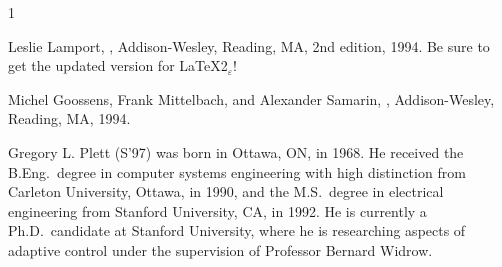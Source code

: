 \documentclass[%
	final,
	notitlepage,
	narroweqnarray,
	inline,
	twoside,
	]{ieee}
\newcommand{\latexiie}{\LaTeX2{\Large$_\varepsilon$}}
\begin{document}
%
%
%
%
%

\begin{thebibliography}{1}

Leslie Lamport,
,
\newblock Addison-Wesley, Reading, MA, 2nd edition, 1994.
\newblock Be sure to get the updated version for \latexiie!

Michel Goossens, Frank Mittelbach, and Alexander Samarin,
,
\newblock Addison-Wesley, Reading, MA, 1994.

\end{thebibliography}


\begin{biography}{Gregory L. Plett} 
(S'97) was born in Ottawa, ON, in 1968. He received the B.Eng.\ degree
in computer systems engineering with high distinction from Carleton
University, Ottawa, in 1990, and the M.S.\ degree in electrical
engineering from Stanford University, CA, in 1992.  He is currently a
Ph.D.\ candidate at Stanford University, where he is researching
aspects of adaptive control under the supervision of Professor Bernard
Widrow.
\end{biography}
\end{document}
